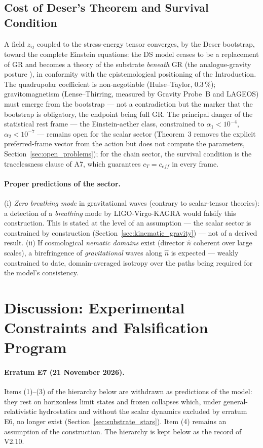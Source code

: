 \documentclass[11pt,a4paper]{article}
\theoremstyle{plain}
\theoremstyle{remark}
\begin{document}
\subsection{Cost of Deser's Theorem and Survival Condition}
A field $z_{ij}$ coupled to the stress-energy tensor converges, by the Deser bootstrap, toward the complete Einstein equations: the DS model ceases to be a replacement of GR and becomes a theory of the substrate \emph{beneath} GR (the analogue-gravity posture \cite{barcelo, volovik}), in conformity with the epistemological positioning of the Introduction. The quadrupolar coefficient is non-negotiable (Hulse--Taylor, $0.3\,\%$); gravitomagnetism (Lense--Thirring, measured by Gravity Probe~B and LAGEOS) must emerge from the bootstrap --- not a contradiction but the marker that the bootstrap is obligatory, the endpoint being full GR. The principal danger of the statistical rest frame --- the Einstein-aether class, constrained to $\alpha_1 < 10^{-4}$, $\alpha_2 < 10^{-7}$ \cite{jacobson_ae, will_ppn} --- remains open for the scalar sector (Theorem~3 removes the explicit preferred-frame vector from the action but does not compute the parameters, Section~\ref{sec:open_problems}); for the chain sector, the survival condition is the tracelessness clause of A7, which guarantees $c_T = c_{eff}$ in every frame.

\paragraph{Proper predictions of the sector.} (i) \emph{Zero breathing mode} in gravitational waves (contrary to scalar-tensor theories): a detection of a \emph{breathing} mode by LIGO-Virgo-KAGRA would falsify this construction. This is stated at the level of an assumption --- the scalar sector is constrained by construction (Section~\ref{sec:kinematic_gravity}) --- not of a derived result. (ii) If cosmological \emph{nematic domains} exist (director $\hat{n}$ coherent over large scales), a birefringence of \emph{gravitational} waves along $\hat{n}$ is expected --- weakly constrained to date, domain-averaged isotropy over the paths being required for the model's consistency.

\section{Discussion: Experimental Constraints and Falsification Program}
\label{sec:discussion}

\paragraph{Erratum E7 (21 November 2026).} Items (1)--(3) of the hierarchy below are withdrawn as predictions of the model: they rest on horizonless limit states and frozen collapses which, under general-relativistic hydrostatics and without the scalar dynamics excluded by erratum E6, no longer exist (Section~\ref{sec:substrate_stars}). Item (4) remains an assumption of the construction. The hierarchy is kept below as the record of V2.10.
\end{document}
